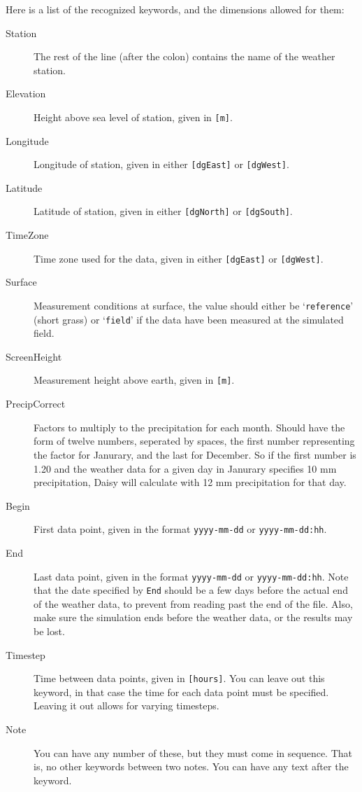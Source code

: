 Here is a list of the recognized keywords, and the dimensions allowed
for them:
\begin{description}
\item[Station] The rest of the line (after the colon) contains the
  name of the weather station.
\item[Elevation] Height above sea level of station, given in
  \texttt{[m]}. 
\item[Longitude] Longitude of station, given in either \texttt{[dgEast]} or
  \texttt{[dgWest]}. 
\item[Latitude] Latitude of station, given in either \texttt{[dgNorth]} or
  \texttt{[dgSouth]}.
\item[TimeZone] Time zone used for the data, given in either
  \texttt{[dgEast]} or \texttt{[dgWest]}.
\item[Surface] Measurement conditions at surface, the value should
  either be `\texttt{reference}' (short grass) or `\texttt{field}' if
  the data have been measured at the simulated field.  
\item[ScreenHeight] Measurement height above earth, given in
  \texttt{[m]}. 
\item[PrecipCorrect] Factors to multiply to the precipitation for each
  month.  Should have the form of twelve numbers, seperated by spaces,
  the first number representing the factor for Janurary, and the last
  for December.  So if the first number is 1.20 and the weather data
  for a given day in Janurary specifies 10 mm precipitation, Daisy
  will calculate with 12 mm precipitation for that day.
\item[Begin] First data point, given in the format
  \texttt{yyyy-mm-dd} or \texttt{yyyy-mm-dd:hh}.
\item[End] Last data point, given in the format \texttt{yyyy-mm-dd} or
  \texttt{yyyy-mm-dd:hh}.  Note that the date specified by
  \texttt{End} should be a few days before the actual end of the
  weather data, to prevent \daisy{} from reading past the end of the
  file.  Also, make sure the simulation ends before the weather data,
  or the results may be lost.
\item[Timestep] Time between data points, given in \texttt{[hours]}.
  You can leave out this keyword, in that case the time for each data
  point must be specified.  Leaving it out allows for varying
  timesteps. 
\item[Note] You can have any number of these, but they must come in
  sequence.  That is, no other keywords between two notes.  You can
  have any text after the keyword. 

\end{description}
